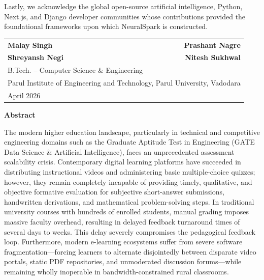 \documentclass[12pt,a4paper,oneside]{report}
\begin{document}
Lastly, we acknowledge the global open-source artificial intelligence, Python, Next.js, and Django developer communities whose contributions provided the foundational frameworks upon which NeuralSpark is constructed.

\vspace{1.5cm}
\noindent
\begin{tabular*}{\textwidth}{@{\extracolsep{\fill}}lr}
    \textbf{Malay Singh} & \textbf{Prashant Nagre} \\
    \textbf{Shreyansh Negi} & \textbf{Nitesh Sukhwal} \\[0.4cm]
    \multicolumn{2}{l}{B.Tech. -- Computer Science \& Engineering} \\
    \multicolumn{2}{l}{Parul Institute of Engineering and Technology, Parul University, Vadodara} \\
    \multicolumn{2}{l}{April 2026} \\
\end{tabular*}

\newpage
\thispagestyle{plain}
\begin{center}
    {\LARGE\bfseries Abstract}\\[0.6cm]
\end{center}

The modern higher education landscape, particularly in technical and competitive engineering domains such as the Graduate Aptitude Test in Engineering (GATE Data Science \& Artificial Intelligence), faces an unprecedented assessment scalability crisis. Contemporary digital learning platforms have succeeded in distributing instructional videos and administering basic multiple-choice quizzes; however, they remain completely incapable of providing timely, qualitative, and objective formative evaluation for subjective short-answer submissions, handwritten derivations, and mathematical problem-solving steps. In traditional university courses with hundreds of enrolled students, manual grading imposes massive faculty overhead, resulting in delayed feedback turnaround times of several days to weeks. This delay severely compromises the pedagogical feedback loop. Furthermore, modern e-learning ecosystems suffer from severe software fragmentation—forcing learners to alternate disjointedly between disparate video portals, static PDF repositories, and unmoderated discussion forums—while remaining wholly inoperable in bandwidth-constrained rural classrooms.
\end{document}
